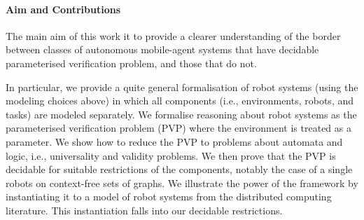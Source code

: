 \documentclass{aamas2015}
\def\gclass{\mathcal{G}}
\def\nat{\mathbb{N}}
\newcommand{\sr}[1]{\footnote{{\color{red} Note. #1}}}
\begin{document}


 


%

\paragraph{Aim and Contributions}
The main aim of this work it to provide a clearer understanding of the border between classes of autonomous mobile-agent systems that have decidable parameterised verification problem, and those that do not.

In particular, we provide a quite general formalisation of robot systems (using the modeling choices above) in which all components (i.e., environments, robots, and tasks) are modeled separately. We formalise reasoning about robot systems as the parameterised verification problem (PVP) where the environment is treated as a parameter. We show how to reduce the PVP to problems about automata and logic, i.e., universality and validity problems. We then prove that the PVP is decidable for suitable restrictions of the components, notably the case of a single robots on context-free sets of graphs. We illustrate the power of the framework by instantiating it to a model of robot systems from the distributed computing literature. This instantiation falls into our decidable restrictions.
\end{document}
